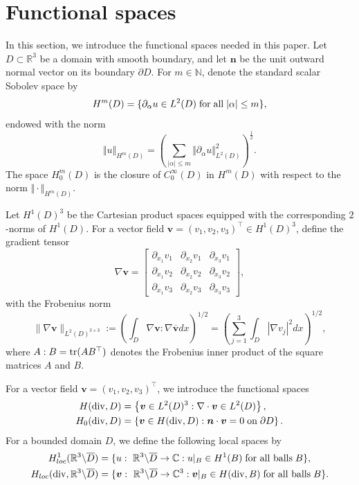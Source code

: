 \documentclass[11pt]{article}
\newcommand{\mat}{\mathbb}
\newcommand{\R}{{\mat R}}
\newcommand{\N}{{\mat N}}
\newcommand{\ds}{\displaystyle}
\newcommand{\ba}{\backslash}
\newcommand{\pa}{\partial}
\newcommand{\ov}{\overline}
\newcommand{\dive}{{\rm div}}
\newcommand{\na}{\nabla}
\newcommand{\bs}{\boldsymbol}
\begin{document}
\section{Functional spaces}\label{sec:fs}
\setcounter{equation}{0}

In this section, we introduce the functional spaces needed in this paper. Let $D\subset  \R^3$ be a domain with smooth boundary, 
and let $\bs{n}$ be the unit outward normal vector on its boundary $\pa D$. For $m\in\N$, denote the standard scalar Sobolev 
space by 
\begin{equation*}
H^m(D)=\{ \pa_{\alpha}u\in L^2(D)\;{\rm for\;all}\;\lvert \alpha \rvert \leq m\},
\end{equation*}
endowed with the norm 
\begin{equation*}
\Vert u\Vert_{H^m(D)}=\left(\ds\sum_{|\alpha|\leq m}\Vert\pa_{\alpha}u\Vert_{L^2(D)}^2\right)^{\frac{1}{2}}.
\end{equation*}
The space $H_0^{m}(D)$ is the closure of $C_0^{\infty }(D)$ in $H^m(D)$ with respect to the norm $\Vert \cdot 
\Vert _{H^m(D)}$.

Let $ H^1(D)^3 $ be the Cartesian product spaces equipped with the corresponding $2$-norms of $ H^1(D) $. 
For a vector field $\bs{v}=(v_1,v_2,v_3)^{\top}\in H^1(D)^3$, define the gradient tensor
\begin{equation*}
\na\bs{v}=\left[
\begin{matrix}
\pa_{x_1}v_1 & \pa_{x_2}v_1 & \pa_{x_3} v_1 \\
\pa_{x_1}v_2 & \pa_{x_2}v_2 & \pa_{x_3} v_2 \\
\pa_{x_1}v_3 & \pa_{x_2}v_3 & \pa_{x_3} v_3
\end{matrix}\right],
\end{equation*}
with the Frobenius norm
\begin{equation*}
\|\nabla \bs{v}\|_{L^2(D)^{3 \times 3}} := \left( \int_{D} \nabla \bs{v}:\nabla \overline{\bs{v}} dx 
\right)^{1/2}=\left( \sum_{j=1}^3 \int_{D} |\nabla v_j|^2 dx \right)^{1/2},
\end{equation*}
where $A:B={\rm tr}(AB^{\top})$ denotes the Frobenius inner product of the square matrices $A$ and $B$.

For a vector field $\bs{v}=(v_1,v_2,v_3)^{\top}$, we introduce the functional spaces
\begin{equation*}
\begin{aligned}
H(\dive,D) &= \left\{\bs{v}\in L^2(D)^3: \nabla \cdot\bs{v}\in L^2(D)\right\}, \\
H_0(\dive,D) &= \left\{\bs{v}\in H(\dive,D): \bs{n}\cdot \bs{v}=0\;{\rm on}\;\pa D\right\}.
\end{aligned}
\end{equation*}
For a bounded domain $D$, we define the following local spaces by
\begin{equation*}
\begin{aligned}
H_{loc}^1(\R^3\ba\ov{D}) &= \{u:\ \R^3\ba\ov{D}\to\mathbb{C}:u|_B\in H^1(B)\;\text{for all balls}\;B\},\\
H_{loc}(\dive,\R^3\ba\ov{D}) &= \{\bs{v}:\ \R^3\ba\ov{D}\to\mathbb{C}^3:\bs{v}|_B\in H(\dive,B)
\;\text{for all balls}\;B\}.
\end{aligned}
\end{equation*}
\end{document}
